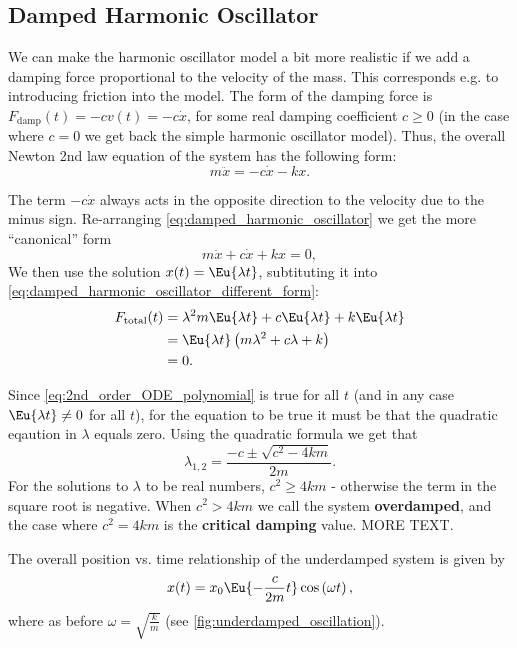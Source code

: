 \subsection{Damped Harmonic Oscillator}
We can make the harmonic oscillator model a bit more realistic if we add a damping force proportional to the velocity of the mass. This corresponds e.g. to introducing friction into the model. The form of the damping force is $F_{\text{damp}}(t)=-cv(t)=-c\dot{x}$, for some real damping coefficient $c\geq0$ (in the case where $c=0$ we get back the simple harmonic oscillator model). Thus, the overall Newton 2nd law equation of the system has the following form:
\begin{equation}
  m\ddot{x} = -c\dot{x}-kx.
  \label{eq:damped_harmonic_oscillator}
\end{equation}

The term $-c\dot{x}$ always acts in the opposite direction to the velocity due to the minus sign. Re-arranging \autoref{eq:damped_harmonic_oscillator} we get the more \enquote{canonical} form
\begin{equation}
  m\ddot{x} + c\dot{x} + kx = 0,
  \label{eq:damped_harmonic_oscillator_different_form}
\end{equation}
We then use the solution $x(t)=\Eu{\lambda t}$, subtituting it into \autoref{eq:damped_harmonic_oscillator_different_form}:
\begin{align}
  F_{\text{total}}(t) &= \lambda^{2}m\Eu{\lambda t} + c\Eu{\lambda t} + k\Eu{\lambda t}\\
  &= \Eu{\lambda t}\left(m\lambda^{2}+c\lambda+k\right)\\
  &= 0.
  \label{eq:2nd_order_ODE_polynomial}
\end{align}

Since \autoref{eq:2nd_order_ODE_polynomial} is true for all $t$ (and in any case $\Eu{\lambda t}\neq 0$ for all $t$), for the equation to be true it must be that the quadratic eqaution in $\lambda$ equals zero. Using the quadratic formula we get that
\begin{equation}
  \lambda_{1,2} = \frac{-c\pm\sqrt{c^{2}-4km}}{2m}.
  \label{eq:2nd_order_ODE_polynomial_solution}
\end{equation}
For the solutions to $\lambda$ to be real numbers, $c^{2}\geq4km$ - otherwise the term in the square root is negative. When $c^{2}>4km$ we call the system \textbf{overdamped}, and the case where $c^{2}=4km$ is the \textbf{critical damping} value. MORE TEXT.

The overall position vs. time relationship of the underdamped system is given by
\begin{equation}
  x(t) = x_{0}\Eu{-\frac{c}{2m}t}\cos\left(\omega t\right),
  \label{eq:underdampled_oscillation}
\end{equation}
where as before $\omega=\sqrt{\frac{k}{m}}$ (see \autoref{fig:underdamped_oscillation}).

